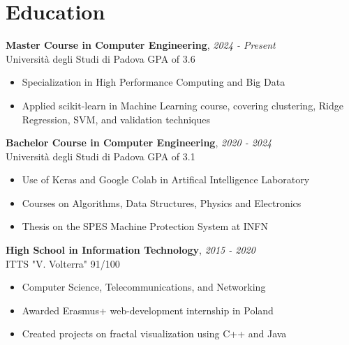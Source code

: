 \documentclass[a4paper,10pt]{article}
\begin{document}
\begin{minipage}[t]{0.58\textwidth}
    \section*{Education}
        \textbf{Master Course in Computer Engineering}, \hfill \textit{2024 - Present} \\
        Università degli Studi di Padova \hfill {GPA of 3.6}
        \vspace{0.1cm}
        \begin{itemize}[left=0.2cm, label={\textbullet}, itemsep=0cm]
            \item Specialization in High Performance Computing and Big Data
            \item Applied scikit-learn in Machine Learning course, covering clustering, Ridge Regression, SVM, and validation techniques
        \end{itemize}
        \vspace{0.2cm}

        \textbf{Bachelor Course in Computer Engineering},  \hfill \textit{2020 - 2024} \\
        Università degli Studi di Padova \hfill {GPA of 3.1}
        \vspace{-0.1cm}
        \begin{itemize}[left=0.2cm, label={\textbullet}, itemsep=0cm]
            \item Use of Keras and Google Colab in Artifical Intelligence Laboratory
            \item Courses on Algorithms, Data Structures, Physics and Electronics
            \item Thesis on the SPES Machine Protection System at INFN
        \end{itemize}
        \vspace{0.2cm}

        \textbf{High School in Information Technology}, \hfill \textit{2015 - 2020} \\
        ITTS "V. Volterra"
        \vspace{-0.1cm} \hfill {91/100}
        \begin{itemize}[left=0.2cm, label={\textbullet}, itemsep=0cm]
            \item Computer Science, Telecommunications, and Networking
            \item Awarded Erasmus+ web-development internship in Poland
            \item Created projects on fractal visualization using C++ and Java
        \end{itemize}


\end{minipage}
\end{document}
